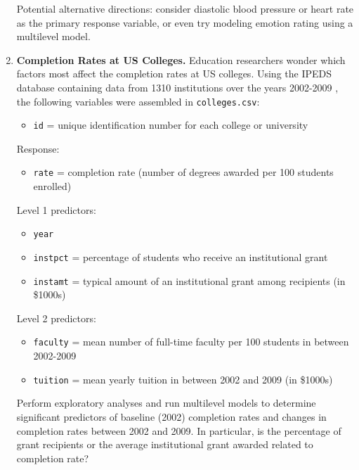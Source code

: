 \documentclass[
]{krantz}
\providecommand{\tightlist}{%
  \setlength{\itemsep}{0pt}\setlength{\parskip}{0pt}}
\begin{document}
\begin{enumerate}
  Potential alternative directions: consider diastolic blood pressure or heart rate as the primary response variable, or even try modeling emotion rating using a multilevel model.
\item
  \textbf{Completion Rates at US Colleges.} Education researchers wonder which factors most affect the completion rates at US colleges. Using the IPEDS database containing data from 1310 institutions over the years 2002-2009 \citep{IPEDS}, the following variables were assembled in \texttt{colleges.csv}:

  \begin{itemize}
  \tightlist
  \item
    \texttt{id} = unique identification number for each college or university
  \end{itemize}

  Response:

  \begin{itemize}
  \tightlist
  \item
    \texttt{rate} = completion rate (number of degrees awarded per 100 students enrolled)
  \end{itemize}

  Level 1 predictors:

  \begin{itemize}
  \tightlist
  \item
    \texttt{year}
  \item
    \texttt{instpct} = percentage of students who receive an institutional grant
  \item
    \texttt{instamt} = typical amount of an institutional grant among recipients (in \$1000s)
  \end{itemize}

  Level 2 predictors:

  \begin{itemize}
  \tightlist
  \item
    \texttt{faculty} = mean number of full-time faculty per 100 students in between 2002-2009
  \item
    \texttt{tuition} = mean yearly tuition in between 2002 and 2009 (in \$1000s)
  \end{itemize}

  Perform exploratory analyses and run multilevel models to determine significant predictors of baseline (2002) completion rates and changes in completion rates between 2002 and 2009. In particular, is the percentage of grant recipients or the average institutional grant awarded related to completion rate?
\end{enumerate}
\end{document}
